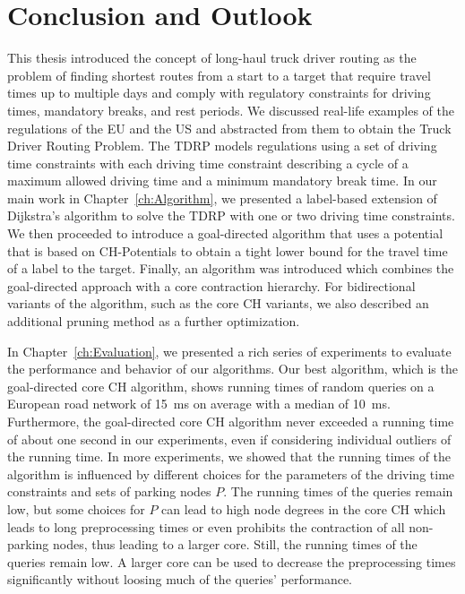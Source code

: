 
\chapter{Conclusion and Outlook}
\label{ch:conclusion}
This thesis introduced the concept of long-haul truck driver routing as the problem of finding shortest routes from a start to a target that require travel times up to multiple days and comply with regulatory constraints for driving times, mandatory breaks, and rest periods. We discussed real-life examples of the regulations of the EU and the US and abstracted from them to obtain the Truck Driver Routing Problem. The TDRP models regulations using a set of driving time constraints with each driving time constraint describing a cycle of a maximum allowed driving time and a minimum mandatory break time. In our main work in Chapter~\ref{ch:Algorithm}, we presented a label-based extension of Dijkstra's algorithm to solve the TDRP with one or two driving time constraints. We then proceeded to introduce a goal-directed algorithm that uses a potential that is based on CH-Potentials to obtain a tight lower bound for the travel time of a label to the target. Finally, an algorithm was introduced which combines the goal-directed approach with a core contraction hierarchy. For bidirectional variants of the algorithm, such as the core CH variants, we also described an additional pruning method as a further optimization.

In Chapter~\ref{ch:Evaluation}, we presented a rich series of experiments to evaluate the performance and behavior of our algorithms. Our best algorithm, which is the goal-directed core CH algorithm, shows running times of random queries on a European road network of \SI{15}{\milli\second} on average with a median of \SI{10}{\milli\second}. Furthermore, the goal-directed core CH algorithm never exceeded a running time of about one second in our experiments, even if considering individual outliers of the running time. In more experiments, we showed that the running times of the algorithm is influenced by different choices for the parameters of the driving time constraints and sets of parking nodes $P$. The running times of the queries remain low, but some choices for $P$ can lead to high node degrees in the core CH which leads to long preprocessing times or even prohibits the contraction of all non-parking nodes, thus leading to a larger core. Still, the running times of the queries remain low. A larger core can be used to decrease the preprocessing times significantly without loosing much of the queries' performance.

